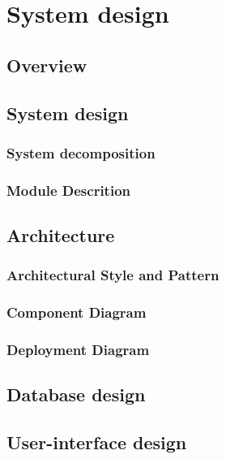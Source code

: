 \chapter{System design}
\section{Overview}

\section{System design}
	\subsection{System decomposition}

	\subsection{Module Descrition}

\section{Architecture}
	\subsection{Architectural Style and Pattern}

	\subsection{Component Diagram}

	\subsection{Deployment Diagram}

\section{Database design}

\section{User-interface design}